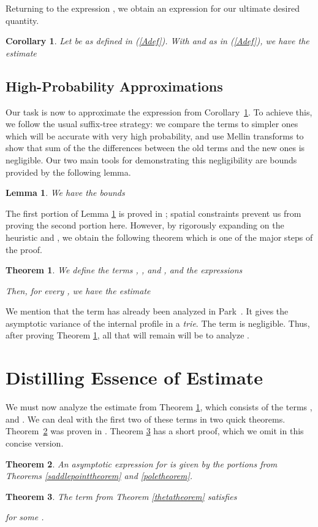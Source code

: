 \documentclass[proceedings]{aofa}
\newtheorem{theorem}{Theorem}
\newtheorem{lemma}{Lemma}
\newtheorem{corollary}{Corollary}
\begin{document}
Returning to the expression , we obtain an expression for our ultimate desired quantity.
\begin{corollary}\label{Acorr}
Let  be as defined in (\ref{Adef}). 
With  and  as in (\ref{Adef}),
we have the estimate

\end{corollary}


\subsection{High-Probability Approximations}
Our task is now to approximate the expression from Corollary~\ref{Acorr}. To achieve this, we follow the usual suffix-tree strategy: we compare the terms to simpler ones which will be accurate with very high probability, and use Mellin transforms to show that sum of the the differences between the old terms and the new ones is negligible. Our two main tools for demonstrating this negligibility are bounds provided by the following lemma.

\begin{lemma}\label{corrlemma}
We have the bounds

\end{lemma}
The first portion of Lemma \ref{corrlemma} is proved in
\cite{Jacquet:2005}; spatial constraints prevent us from proving the
second portion here. However, by rigorously expanding on the heuristic  and , we obtain the following theorem which is one of the major steps of the proof.
\begin{theorem}\label{mellintheorem}
We define the terms
,
,
and ,
and the expressions


Then, for every , we have the estimate

\end{theorem}
We mention that the term  has already been analyzed in Park~\cite{Park:2009}.
It gives the asymptotic variance of the internal profile in a
\emph{trie}.
The term  is negligible. Thus, after proving Theorem \ref{mellintheorem}, all that will remain will be to analyze .


\section{Distilling Essence of Estimate}
We must now analyze the estimate from Theorem \ref{mellintheorem}, which consists of the terms ,  and . We can deal with the first two of these terms in two quick theorems.
Theorem~\ref{Parktheorem} was proven in \cite{Park:2009}.
Theorem \ref{Ktheorem} has a short proof, which we omit  in this concise version.
\begin{theorem}\label{Parktheorem}
An asymptotic expression for  is given by the  portions from Theorems \ref{saddlepointtheorem} and \ref{poletheorem}.
\end{theorem} 
\begin{theorem}\label{Ktheorem}
The term  from Theorem \ref{thetatheorem} satisfies

for some .
\end{theorem}
\end{document}
